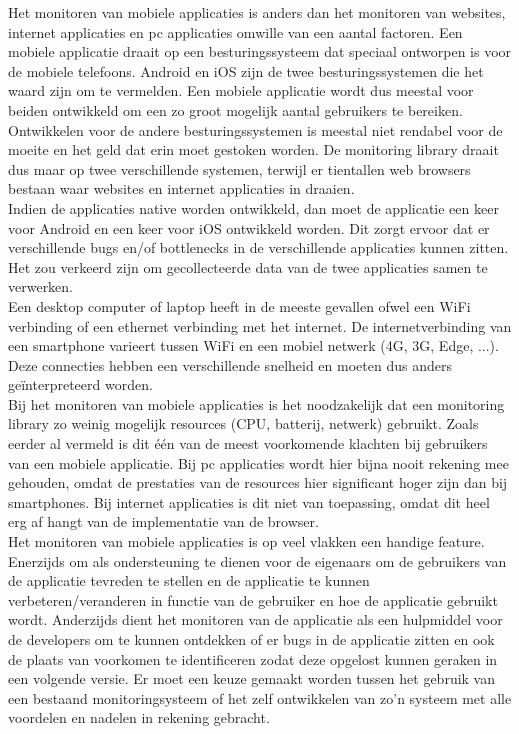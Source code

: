 Het monitoren van mobiele applicaties is anders dan het monitoren van websites, internet applicaties en pc applicaties omwille van een aantal factoren. Een mobiele applicatie draait op een besturingssysteem dat speciaal ontworpen is voor de mobiele telefoons. Android en iOS zijn de twee besturingssystemen die het waard zijn om te vermelden. Een mobiele applicatie wordt dus meestal voor beiden ontwikkeld om een zo groot mogelijk aantal gebruikers te bereiken. Ontwikkelen voor de andere besturingssystemen is meestal niet rendabel voor de moeite en het geld dat erin moet gestoken worden. De monitoring library draait dus maar op twee verschillende systemen, terwijl er tientallen web browsers bestaan waar websites en internet applicaties in draaien. \\
Indien de applicaties native worden ontwikkeld, dan moet de applicatie een keer voor Android en een keer voor iOS ontwikkeld worden. Dit zorgt ervoor dat er verschillende bugs en/of bottlenecks in de verschillende applicaties kunnen zitten. Het zou verkeerd zijn om gecollecteerde data van de twee applicaties samen te verwerken. \\
Een desktop computer of laptop heeft in de meeste gevallen ofwel een WiFi verbinding of een ethernet verbinding met het internet. De internetverbinding van een smartphone varieert tussen WiFi en een mobiel netwerk (4G, 3G, Edge, ...). Deze connecties hebben een verschillende snelheid en moeten dus anders ge\"interpreteerd worden. \\

Bij het monitoren van mobiele applicaties is het noodzakelijk dat een monitoring library zo weinig mogelijk resources (CPU, batterij, netwerk) gebruikt. Zoals eerder al vermeld is dit \'e\'en van de meest voorkomende klachten bij gebruikers van een mobiele applicatie. Bij pc applicaties wordt hier bijna nooit rekening mee gehouden, omdat de prestaties van de resources hier significant hoger zijn dan bij smartphones. Bij internet applicaties is dit niet van toepassing, omdat dit heel erg af hangt van de implementatie van de browser. \\


Het monitoren van mobiele applicaties is op veel vlakken een handige feature. Enerzijds om als ondersteuning te dienen voor de eigenaars om de gebruikers van de applicatie tevreden te stellen en de applicatie te kunnen verbeteren/veranderen in functie van de gebruiker en hoe de applicatie gebruikt wordt. Anderzijds dient het monitoren van de applicatie als een hulpmiddel voor de developers om te kunnen ontdekken of er bugs in de applicatie zitten en ook de plaats van voorkomen te identificeren zodat deze opgelost kunnen geraken in een volgende versie. Er moet een keuze gemaakt worden tussen het gebruik van een bestaand monitoringsysteem of het zelf ontwikkelen van zo'n systeem met alle voordelen en nadelen in rekening gebracht. \\


